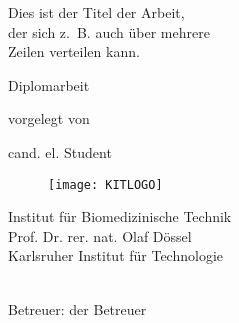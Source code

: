 \begin{titlepage}
 \parindent0cm
   \begin{center}
   \begin{bf}

\begin{minipage}[c]{15.5cm}
\begin{center}
   \begin{huge}
   \hspace{-1cm}
     Dies ist der Titel der Arbeit,\\
   \hspace{-1cm}
     der sich z.~B. auch \"uber mehrere\\
   \hspace{-1cm}
      Zeilen verteilen kann.\\
   \end {huge}
\end{center}
\end{minipage}

    \vspace{5cm}
    {\Large Diplomarbeit}\\
    \end{bf}
    
    \vspace{0.5cm}
     {\large vorgelegt von}\\
    \vspace{0.5cm}
    \begin{bf}    
     {\Large cand. el. Student}
   \vspace{5cm}
    \end{bf}

\begin{figure}[ht]
 \centering\texttt{[image: KITLOGO]}
\end{figure}
 \begin{sc}
 Institut f\"ur Biomedizinische Technik\\
 Prof. Dr. rer. nat. Olaf D\"ossel\\
 Karlsruher Institut f\"ur Technologie\\
\the\year\\
 \end{sc}

 \vspace{0.5cm}
   Betreuer: der Betreuer\\
  \end{center}
\end{titlepage}

